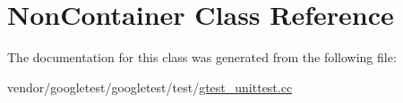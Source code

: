 \hypertarget{class_non_container}{}\section{Non\+Container Class Reference}
\label{class_non_container}


The documentation for this class was generated from the following file\+:\begin{DoxyCompactItemize}
\item 
vendor/googletest/googletest/test/\hyperlink{gtest__unittest_8cc}{gtest\+\_\+unittest.\+cc}\end{DoxyCompactItemize}
